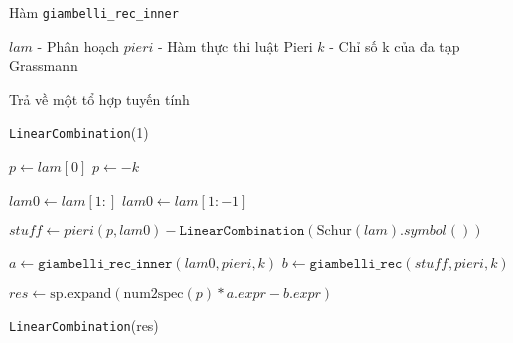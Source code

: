 \documentclass[11pt,a4paper]{book}
\begin{document}
\begin{algorithm}
	\caption{Hàm \texttt{giambelli\_rec\_inner}}
	\begin{algorithmic}[1] %
	
	\Require 
	\State $lam$ - Phân hoạch
	\State $pieri$ - Hàm thực thi luật Pieri
	\State $k$ - Chỉ số k của đa tạp Grassmann
	
	\Ensure Trả về một tổ hợp tuyến tính
	
		\State \Return \texttt{LinearCombination}(1) 
	\EndIf
	
	\State $p \leftarrow lam[0]$ 
		\State $p \leftarrow -k$ 
	\EndIf
	
	\State $lam0 \leftarrow lam[1:]$ 
		\State $lam0 \leftarrow lam[1:-1]$ 
	\EndIf
	
	\State $stuff \leftarrow pieri(p, lam0) - \texttt{LinearCombination}(\text{Schur}(lam).symbol())$ 
	
	\State $a \leftarrow \texttt{giambelli\_rec\_inner}(lam0, pieri, k)$ 
	\State $b \leftarrow \texttt{giambelli\_rec}(stuff, pieri, k)$ 
	
	\State $res \leftarrow \text{sp.expand}(\text{num2spec}(p) * a.expr - b.expr)$ 
	
	\Return \texttt{LinearCombination}(res) 
	
	\end{algorithmic}
\end{algorithm}
\end{document}
